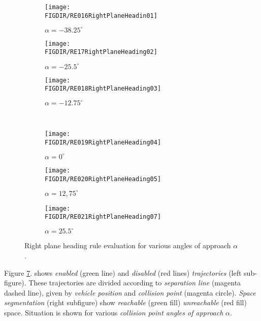     \begin{figure}[H]
    	\centering
        \begin{subfigure}{0.32\textwidth}
        	\centering
            \texttt{[image: \\FIGDIR/RE016RightPlaneHeadin01]} 
            \caption{$\alpha=-38.25^\circ$}
            \label{fig:ruleRightPlaneHeading01}
        \end{subfigure}
        \begin{subfigure}{0.32\textwidth}
        	\centering
            \texttt{[image: \\FIGDIR/RE17RightPlaneHeading02]} 
            \caption{$\alpha=-25.5^\circ$}
            \label{fig:ruleRightPlaneHeading02}
        \end{subfigure}
        \begin{subfigure}{0.32\textwidth}
        	\centering
            \texttt{[image: \\FIGDIR/RE018RightPlaneHeading03]} 
            \caption{$\alpha=-12.75^\circ$}
            \label{fig:ruleRightPlaneHeading03}
        \end{subfigure}
        \\
        \begin{subfigure}{0.32\textwidth}
        	\centering
            \texttt{[image: \\FIGDIR/RE019RightPlaneHeading04]} 
            \caption{$\alpha=0^\circ$}
            \label{fig:ruleRightPlaneHeading04}
        \end{subfigure}
        \begin{subfigure}{0.32\textwidth}
        	\centering
            \texttt{[image: \\FIGDIR/RE020RightPlaneHeading05]} 
            \caption{$\alpha=12,75^\circ$}
            \label{fig:ruleRightPlaneHeading05}
        \end{subfigure}
        \begin{subfigure}{0.32\textwidth}
        	\centering
            \texttt{[image: \\FIGDIR/RE021RightPlaneHeading07]} 
            \caption{$\alpha=25.5^\circ$}
            \label{fig:ruleRightPlaneHeading06}
        \end{subfigure}
        \caption{Right plane heading rule evaluation for various angles of approach $\alpha$.}        
        \label{fig:ruleRightPlaneHeadingGeneral}
    \end{figure}
    
    \noindent Figure \ref{fig:ruleRightPlaneHeadingGeneral}. shows \emph{enabled} (green line) and \emph{disabled} (red lines) \emph{trajectories} (left sub-figure). These trajectories are divided according to \emph{separation line} (magenta dashed line), given by \emph{vehicle position} and \emph{collision point} (magenta circle). \emph{Space segmentation} (right subfigure) show \emph{reachable} (green fill) \emph{unreachable} (red fill) space. Situation is shown for various \emph{collision point angles of approach} $\alpha$.
    
